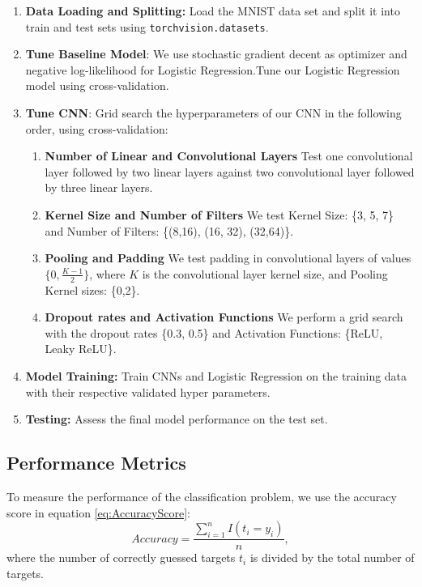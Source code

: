\begin{enumerate}
    \item \textbf{Data Loading and Splitting:} Load the MNIST data set and split it into train and test sets using     \texttt{torchvision.datasets}. 
    \item \textbf{Tune Baseline Model}: We use stochastic gradient decent as optimizer and negative log-likelihood for Logistic Regression.Tune our Logistic Regression model using cross-validation.
    \item \textbf{Tune CNN}: Grid search the hyperparameters of our CNN in the following order, using cross-validation:
    \begin{enumerate}
        \item \textbf{Number of Linear and Convolutional Layers} Test one convolutional layer followed by two linear layers against two convolutional layer followed by three linear layers.
        \item \textbf{Kernel Size and Number of Filters}
        We test Kernel Size: \{3, 5, 7\} and Number of Filters: \{(8,16), (16, 32), (32,64)\}.
        \item \textbf{Pooling and Padding}
        We test padding in convolutional layers of values $\{0,\frac {K-1}2\}$, where $K$ is the convolutional layer kernel size, and Pooling Kernel sizes: \{0,2\}.
        \item \textbf{Dropout rates and Activation Functions}
        We perform a grid search with the dropout rates \{0.3, 0.5\} and Activation Functions: \{ReLU, Leaky ReLU\}.
    \end{enumerate}
    \item \textbf{Model Training:} Train CNNs and Logistic Regression on the training data with their respective validated hyper parameters. 
    \item \textbf{Testing:} Assess the final model performance on the test set. 
\end{enumerate}


\subsection{Performance Metrics}

To measure the performance of the classification problem, we use the accuracy score in equation \ref{eq:AccuracyScore}: \begin{equation}
    Accuracy = \frac{\sum_{i=1}^n I(t_i = y_i)}{n},
    \label{eq:AccuracyScore}
\end{equation}
where the number of correctly guessed targets $t_i$ is divided by the total number of targets.

